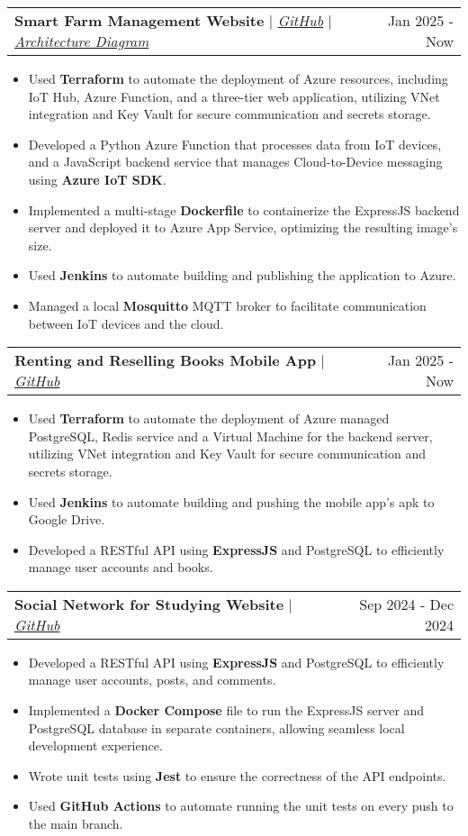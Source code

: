\documentclass[letterpaper,11pt]{article}
\makeatletter
\newcommand{\resumeItem}[1]{
  \item\small{
    {#1 \vspace{-2pt}}
  }
}
\newcommand{\resumeProjectHeading}[2]{
    \vspace{-2pt}\item
    \begin{tabular*}{0.97\textwidth}{l@{\extracolsep{\fill}}r}
      #1 & \small#2 \\
    \end{tabular*}\vspace{-7pt}
}
\newcommand{\resumeItemListStart}{\begin{itemize}}
\newcommand{\resumeItemListEnd}{\end{itemize}\vspace{-5pt}}
\makeatother
\begin{document}
      \resumeProjectHeading
        {\textbf{Smart Farm Management Website} $|$ \emph{\href{https://github.com/kng1259/IOT-project}{GitHub}} $|$ \emph{\href{https://drive.google.com/file/d/1R50MEnKQcrV0OXfp1K20jsz2jnyDsDmk/view?usp=sharing}{Architecture Diagram}}}{Jan 2025 - Now}
          \resumeItemListStart
            \resumeItem{Used \textbf{Terraform} to automate the deployment of Azure resources, including IoT Hub, Azure Function, and a three-tier web application, utilizing VNet integration and Key Vault for secure communication and secrets storage.}
            \resumeItem{Developed a Python Azure Function that processes data from IoT devices, and a JavaScript backend service that manages Cloud-to-Device messaging using \textbf{Azure IoT SDK}.}
            \resumeItem{Implemented a multi-stage \textbf{Dockerfile} to containerize the ExpressJS backend server and deployed it to Azure App Service, optimizing the resulting image's size.}
            \resumeItem{Used \textbf{Jenkins} to automate building and publishing the application to Azure.}
            \resumeItem{Managed a local \textbf{Mosquitto} MQTT broker to facilitate communication between IoT devices and the cloud.}
          \resumeItemListEnd
      
      \resumeProjectHeading
        {\textbf{Renting and Reselling Books Mobile App} $|$ \emph{\href{https://github.com/btram11/Mobile-242}{GitHub}}}{Jan 2025 - Now}
          \resumeItemListStart
            \resumeItem{Used \textbf{Terraform} to automate the deployment of Azure managed PostgreSQL, Redis service and a Virtual Machine for the backend server, utilizing VNet integration and Key Vault for secure communication and secrets storage.}
            \resumeItem{Used \textbf{Jenkins} to automate building and pushing the mobile app's apk to Google Drive.}
            \resumeItem{Developed a {RESTful API} using \textbf{ExpressJS} and PostgreSQL to efficiently manage user accounts and books.}
          \resumeItemListEnd

      \resumeProjectHeading
        {\textbf{Social Network for Studying Website} $|$ \emph{\href{https://github.com/NguyenVu04/Do_An}{GitHub}}}{Sep 2024 - Dec 2024}
          \resumeItemListStart
            \resumeItem{Developed a {RESTful API} using \textbf{ExpressJS} and PostgreSQL to efficiently manage user accounts, posts, and comments.}
            \resumeItem{Implemented a \textbf{Docker Compose} file to run the ExpressJS server and PostgreSQL database in separate containers, allowing seamless local development experience.}
            \resumeItem{Wrote unit tests using \textbf{Jest} to ensure the correctness of the API endpoints.}
            \resumeItem{Used \textbf{GitHub Actions} to automate running the unit tests on every push to the main branch.}
          \resumeItemListEnd
      
\end{document}
